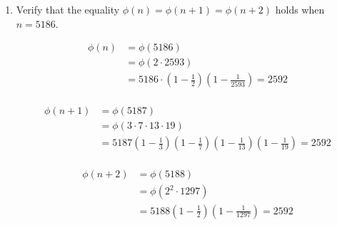 \documentclass[12pt]{exam}
\theoremstyle{definition}
\begin{document}
\begin{enumerate}
    \item Verify that the equality $\phi(n) = \phi(n + 1) = \phi(n + 2)$ holds when $n = 5186$.

          \begin{answer}
              \begin{equation}
                  \tag{1}
                  \begin{aligned}
                      \phi(n) & = \phi(5186)                                               \\
                              & = \phi(2 \cdot 2593)                                       \\
                              & = 5186 \cdot (1 - \frac{1}{2}) (1 - \frac{1}{2593}) = 2592 \\
                  \end{aligned}
                  \label{eqn:2.1}
              \end{equation}

              \begin{equation}
                  \tag{2}
                  \begin{aligned}
                      \phi(n+1) & = \phi(5187)                                                                    \\
                                & = \phi(3 \cdot 7 \cdot 13 \cdot 19)                                             \\
                                & = 5187 (1-\frac{1}{3}) (1-\frac{1}{7}) (1-\frac{1}{13}) (1-\frac{1}{19}) = 2592 \\
                  \end{aligned}
                  \label{eqn:2.2}
              \end{equation}

              \begin{equation}
                  \tag{3}
                  \begin{aligned}
                      \phi(n+2) & = \phi(5188)                                     \\
                                & = \phi(2^2 \cdot 1297)                           \\
                                & = 5188 (1-\frac{1}{2}) (1-\frac{1}{1297}) = 2592
                  \end{aligned}
                  \label{eqn:2.3}
              \end{equation}


\end{answer}
\end{enumerate}
\end{document}

